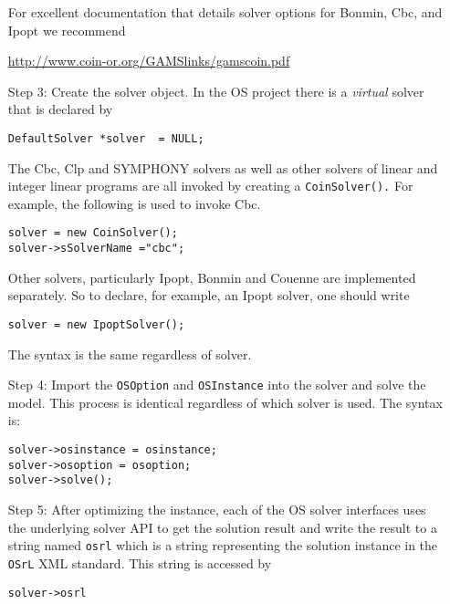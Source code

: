 \documentclass[11pt]{article}
\renewcommand{\_}{{\char"5F}}
\renewcommand{\{}{{\char"7B}}
\renewcommand{\}}{{\char"7D}}
\renewcommand{\^}{{\char"0D}}
\renewcommand{\'}{{\char"0D}}
\begin{document}
\begin{itemize}
For excellent documentation that details solver options for Bonmin, Cbc, and Ipopt  we recommend 

\begin{center}
\url{http://www.coin-or.org/GAMSlinks/gamscoin.pdf}
\end{center}


\item[Step 3:] Create the solver object. In the OS project there is a {\it virtual} solver that 
is declared by

\begin{verbatim}
DefaultSolver *solver  = NULL;
\end{verbatim}

The Cbc, Clp and SYMPHONY solvers as well as other solvers of linear and integer linear programs
are all invoked by creating a {\tt CoinSolver().} For example, the following is used to invoke Cbc.

\begin{verbatim}
solver = new CoinSolver();
solver->sSolverName ="cbc";
\end{verbatim}

Other solvers, particularly Ipopt, Bonmin and Couenne are implemented separately. So to declare,
for example, an Ipopt solver, one should write

\begin{verbatim}
solver = new IpoptSolver();
\end{verbatim}

The syntax is the same regardless of solver. 

\item[Step 4:] Import the {\tt OSOption} and {\tt OSInstance} into the solver and solve the model. 
This process is identical regardless of which solver is used. The syntax is:

\begin{verbatim}
solver->osinstance = osinstance;
solver->osoption = osoption;	
solver->solve();
\end{verbatim}

\item[Step 5:] After optimizing the instance,  each of the OS solver interfaces uses the underlying solver API to get the solution result and write the result to a string 
named {\tt osrl} which is a string representing the solution instance in the {\tt OSrL} XML standard.  
This string is accessed by

\begin{verbatim}
solver->osrl
\end{verbatim}



\end{itemize}
\end{document}
